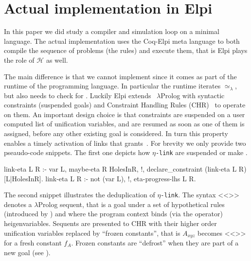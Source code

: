 \documentclass[sigconf,natbib=false,review]{acmart}
\newcommand{\UnifRel}{\ensuremath{\simeq}}
\newcommand{\Ue}{\ensuremath{\UnifRel_\lambda}\xspace}
\newcommand{\llambda}{\ensuremath{\mathcal{L}}\xspace}
\newcommand{\linkMacro}[1]{\ensuremath{#1}\texttt{-link}\xspace}
\newcommand{\linketa} {\linkMacro{\eta}}
\newcommand{\Ho}{\texorpdfstring{\ensuremath{\mathcal{H}}\xspace}{H}}
\begin{document}
%
\section{Actual implementation in Elpi}\label{sec:implementation}

In this paper we did study a compiler and simulation loop on a minimal language.
The actual implementation uses the Coq-Elpi meta language to both compile
the sequence of problems (the rules) and execute them, that is Elpi
plays the role of \Ho{} as well.

The main difference is that we cannot implement \hrun since it comes as part of
the runtime of the programming language. In particular the runtime iterates
\Ue, but \hstep also needs to check for \progress. Luckily Elpi extends~\cite{TASSI_2019}
$\lambda$Prolog with syntactic constraints (suspended goals) and
Constraint Handling Rules (CHR)~\cite{fruehwirth2017constraint} to operate on them.
An important design choice is that constraints are suspended on a user
computed list of unification variables, and are resumed as soon as one of them
is assigned, before any other existing goal is considered. In turn this
property enables a timely activation of links that grants~.
For brevity we only provide two pseaudo-code snippets. The first one depicts
how \linketa are suspended or make \progress.

\begin{elpicode}
link-eta L R :- var L, maybe-eta R HolesInR, !,
  declare_constraint (link-eta L R) [L|HolesInR].
link-eta L R :- not (var L), !, eta-progress-lhs L R.
\end{elpicode}

\noindent
The second snippet illustrates the deduplication of \linketa. The syntax
<<>> denotes a $\lambda$Prolog sequent, that is a 
goal  under a set  of hypothetical rules (introduced
by \elpiIn{=>}) and where the program context binds (via the 
operator)  heigenvariables. Sequents are presented to
CHR with their higher order unification variables replaced by
``frozen constants'', that is $A_{xyz}$ becomes <<>>
for a fresh constant $f_A$. Frozen constants are ``defrost'' when
they are part of a new goal (see \cite[section 4.3]{TASSI_2019}).
\end{document}
